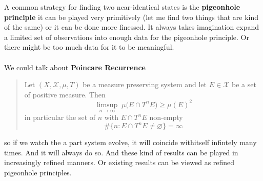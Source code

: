 \documentclass[12pt]{article}
\begin{document}
A common strategy for finding two near-identical states is the \textbf{pigeonhole principle} it can be played very primitively (let me find two things that are kind of the same) or it can be done more finessed.  It always takes imagination expand a limited set of observations into enough data for the pigeonhole principle.  Or there might be too much data for it to be meaningful. \\ \\
We could talk about \textbf{Poincare Recurrence}
\begin{quotation}
Let $(X, \mathcal{X}, \mu, T) $ be a measure preserving system and let $E\in \mathcal{X} $ be a set of positive measure. Then 
$$ \limsup_{n \to \infty} \; \mu \big( E \cap T^n E\big) \geq \mu(E)^2 $$
in particular the set of $n$ with $E \cap T^nE$ non-empty 
$$ \# \big\{  n : E \cap T^n E \neq \varnothing \big\}  = \infty $$
\end{quotation}
so if we watch the a part system evolve, it will coincide withitself infintely many times.  And it will always do so.  And these kind of results can be played in increasingly refined manners.  Or existing results can be viewed as refined pigeonhole principles. 

\newpage
\end{document}
